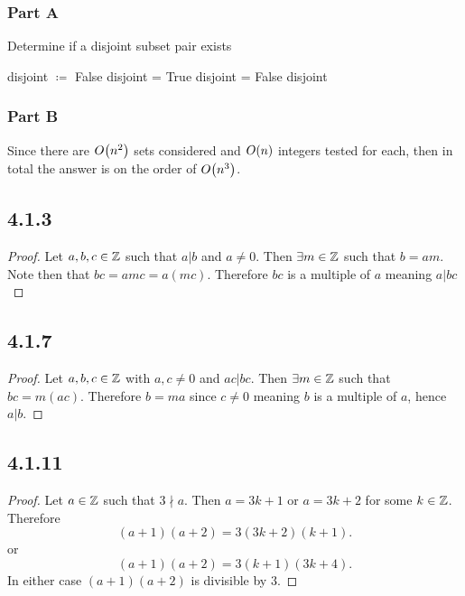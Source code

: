 \documentclass[12pt,titlepage]{extarticle}
\begin{document}
\subsubsection*{Part A}
\begin{algorithm}[H]
    \caption{Determine if a disjoint subset pair exists}
    \begin{algorithmic}[1]
        \State disjoint $\coloneq$ False
                \State disjoint = True 
                    \State disjoint = False
                \EndIf
                \EndFor
            \EndFor
        \EndFor
        \State \Return disjoint
        \EndFunction
    \end{algorithmic}
\end{algorithm}

\subsubsection*{Part B}
Since there are $O\qty(n^2)$ sets considered and $O\qty(n)$ integers tested for each, then in total the answer is on the order of $O\qty(n^3)$.

\subsection*{4.1.3}
\begin{proof}
    Let $a,b,c \in \mathbb{Z}$ such that $a \vert b$ and $a \neq 0$. Then $\exists m \in \mathbb{Z}$ such that $b = am$. Note then that $bc = amc = a(mc)$. Therefore $bc$ is a multiple of $a$ meaning $a \vert bc$
\end{proof}

\subsection*{4.1.7}
\begin{proof}
    Let $a,b,c \in \mathbb{Z}$ with $a,c \neq 0$ and $ac \vert bc$. Then $\exists m \in \mathbb{Z}$ such that $bc = m(ac)$. Therefore $b = ma$ since $c \neq 0$ meaning $b$ is a multiple of $a$, hence $a \vert b$.
\end{proof}

\subsection*{4.1.11}
\begin{proof}
    Let $a \in \mathbb{Z}$ such that $3 \nmid a$. Then $a = 3k + 1$ or $a = 3k + 2$ for some $k \in \mathbb{Z}$. Therefore
    \[
        (a+1)(a+2) = 3(3k + 2)(k + 1)
    .\]
    or
    \[
        (a+1)(a+2) = 3(k+1)(3k+4)
    .\]
    In either case $(a+1)(a+2)$ is divisible by $3$.
\end{proof}
\end{document}
